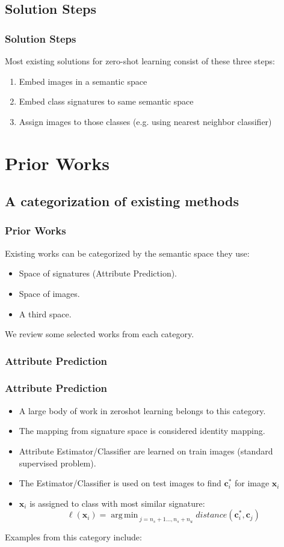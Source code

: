 \documentclass{beamer}
\DeclareMathOperator*{\argmin}{arg\,min\,}
\begin{document}
\subsection{Solution Steps}
\label{sub:Solution Steps}

\begin{frame}\frametitle{Solution Steps}
Most existing solutions for zero-shot learning consist of these three steps:
\begin{enumerate} \pause
\item Embed images in a semantic space \pause
\item Embed class signatures to same semantic space \pause
\item Assign images to those classes (e.g. using nearest neighbor classifier)
\end{enumerate}
\end{frame}
\section{Prior Works}
\subsection{A categorization of existing methods}
\label{sec:Prior Works}
\begin{frame}\frametitle{Prior Works}
  Existing works can be categorized by the semantic space they use:
  \begin{itemize}
    \item Space of signatures (Attribute Prediction).
    \item Space of images.
    \item A third space.
  \end{itemize}
  We review some selected works from each category.
\end{frame}
\subsubsection{Attribute Prediction}
\begin{frame}\frametitle{Attribute Prediction}
  \begin{itemize}
    \item A large body of work in zeroshot learning belongs to this category.
    \item The mapping from signature space is considered identity mapping.
    \item Attribute Estimator/Classifier are learned on train images (standard supervised problem).
    \item The Estimator/Classifier is used on test images to find $\mathbf{c}^{\ast}_i$ for image $\mathbf{x}_i$
    \item $\mathbf{x}_i$ is assigned to class with most similar signature:
    $$ \ell(\mathbf{x}_i) = \argmin_{j=n_s+1 \ldots, n_s + n_u} distance(\mathbf{c}^{\ast}_i, \mathbf{c}_j) $$
  \end{itemize}

  Examples from this category include: \cite{akata13,jayaraman14,lampert09}
\end{frame}
\end{document}

